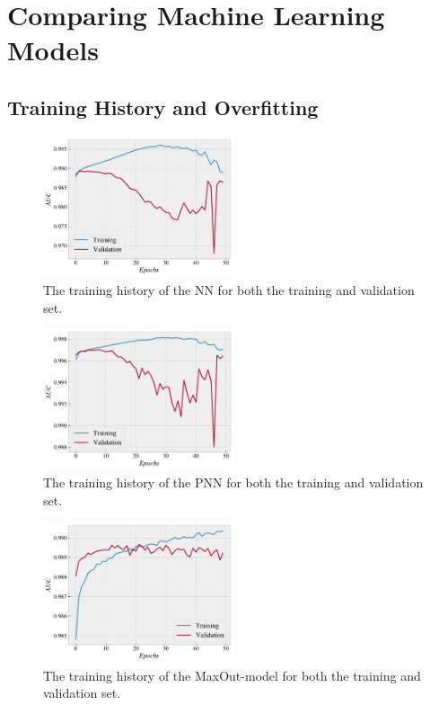 \section{Comparing Machine Learning Models}
\subsection{Training History and Overfitting}
\begin{figure}
    \centering
    \includegraphics[width=0.5\textwidth]{Figures/MLResults/NN/SUSY/History/NNHistory.pdf}
    \caption{The training history of the \ac{NN} for both the training and validation set.}
    \label{fig:NNHist}
\end{figure}
\begin{figure}
    \centering
    \includegraphics[width=0.5\textwidth]{Figures/MLResults/NN/SUSY/History/PNNHistory.pdf}
    \caption{The training history of the \ac{PNN} for both the training and validation set.}
    \label{fig:PNNHist}
\end{figure}

\begin{figure}
    \centering
    \includegraphics[width=0.5\textwidth]{Figures/MLResults/NN/SUSY/History/MaxOutHistory.pdf}
    \caption{The training history of the MaxOut-model for both the training and validation set.}
    \label{fig:MaxOutHist}
\end{figure}